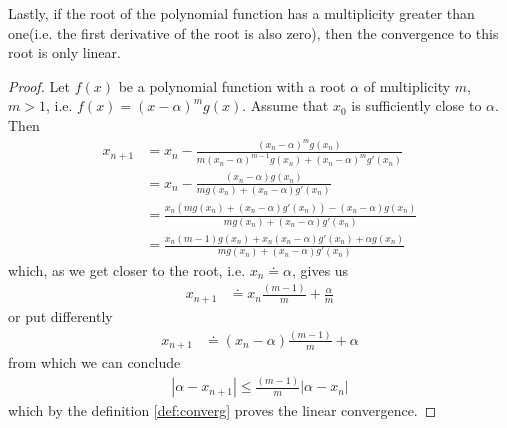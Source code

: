 \documentclass[
  digital, %
  table,   %
  nolof,     %
  nolot,     %
	draft, %
]{fithesis3}
\begin{document}
Lastly, if the root of the polynomial function has a multiplicity greater than one(i.e. the first derivative of the root is also zero), then the convergence to this root is only linear.
\begin{proof}
Let $f(x)$ be a polynomial function with a root $\alpha$ of multiplicity $m$, $m > 1$, i.e. $f(x) = (x-\alpha)^{m}g(x)$. Assume that $x_{0}$ is sufficiently close to $\alpha$. Then
\begin{align}
x_{n+1} &= x_{n} - \frac{(x_{n} - \alpha)^{m}g(x_{n})}{m(x_{n}-\alpha)^{m-1}g(x_{n}) + (x_{n}-\alpha)^{m}g'(x_{n})} \\
&= x_{n} - \frac{(x_{n} - \alpha)g(x_{n})}{mg(x_{n}) + (x_{n}-\alpha)g'(x_{n})} \\
&= \frac{x_{n}(mg(x_{n}) + (x_{n}-\alpha)g'(x_{n})) - (x_{n} - \alpha)g(x_{n})}{mg(x_{n}) + (x_{n}-\alpha)g'(x_{n})} \\
&= \frac{x_{n}(m - 1)g(x_{n}) + x_{n}(x_{n}-\alpha)g'(x_{n}) + {\alpha}g(x_{n})}{mg(x_{n}) + (x_{n}-\alpha)g'(x_{n})}
\end{align}
which, as we get closer to the root, i.e. $x_{n} \doteq \alpha$, gives us
\begin{align}
x_{n+1} &\doteq x_{n}\frac{(m - 1)}{m}+\frac{\alpha}{m}
\end{align}
or put differently
\begin{align}
x_{n+1} &\doteq (x_{n}-\alpha)\frac{(m - 1)}{m}+\alpha
\end{align}
from which we can conclude
\begin{align}
\left|\alpha - x_{n+1}\right| \leq \frac{(m - 1)}{m}\left|\alpha-x_{n}\right|
\end{align}
which by the definition \ref{def:converg} proves the linear convergence.
\end{proof}
\end{document}
